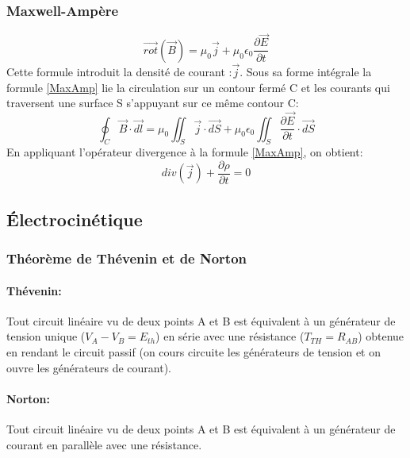 \documentclass[10pt,a4paper]{article}
\begin{document}
\subsubsection{Maxwell-Ampère}
\begin{equation}
\overrightarrow{rot}(\overrightarrow{B}) = \mu_{0}\overrightarrow{j} + \mu_{0}\epsilon_{0}\frac{\partial\overrightarrow{E}}{\partial t}
\label{MaxAmp}
\end{equation}
Cette formule introduit la densité de courant :$\overrightarrow{j}$.
Sous sa forme intégrale la formule \ref{MaxAmp} lie la circulation sur un contour fermé C et les courants qui traversent une surface S s'appuyant sur ce même contour C:
\begin{equation}
\oint_{C}\overrightarrow{B}\cdot\overrightarrow{dl} = \mu_{0}\iint_{S}\overrightarrow{j}\cdot\overrightarrow{dS} + \mu_{0}\epsilon_{0}\iint_{S}\frac{\partial\overrightarrow{E}}{\partial t}\cdot\overrightarrow{dS}
\end{equation}
En appliquant l'opérateur divergence à la formule \ref{MaxAmp}, on obtient:
\begin{equation}
div(\overrightarrow{j}) + \frac{\partial \rho}{\partial t} = 0
\end{equation}

\subsection{Électrocinétique}
\subsubsection{Théorème de Thévenin et de Norton}
\paragraph{Thévenin: } Tout circuit linéaire vu de deux points A et B est équivalent à un générateur de tension unique ($V_{A} - V_{B} = E_{th}$) en série avec une résistance ($T_{TH} = R_{AB}$) obtenue en rendant le circuit passif (on cours circuite les générateurs de tension et on ouvre les générateurs de courant).
\paragraph{Norton: } Tout circuit linéaire vu de deux points A et B est équivalent à un générateur de courant en parallèle avec une résistance.
\end{document}
